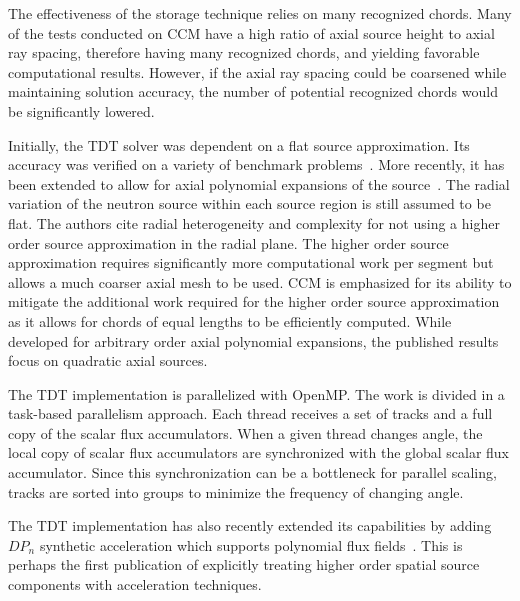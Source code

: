 
The effectiveness of the storage technique relies on many recognized chords. Many of the tests conducted on \ac{CCM} have a high ratio of axial source height to axial ray spacing, therefore having many recognized chords, and yielding favorable computational results. However, if the axial ray spacing could be coarsened while maintaining solution accuracy, the number of potential recognized chords would be significantly lowered.



Initially, the TDT solver was dependent on a flat source approximation. Its accuracy was verified on a variety of benchmark problems~\cite{apollo3_3dmoc, apollo3_vv}. More recently, it has been extended to allow for axial polynomial expansions of the source~\cite{apollo3_extruded}. The radial variation of the neutron source within each source region is still assumed to be flat. The authors cite radial heterogeneity and complexity for not using a higher order source approximation in the radial plane. The higher order source approximation requires significantly more computational work per segment but allows a much coarser axial mesh to be used. \ac{CCM} is emphasized for its ability to mitigate the additional work required for the higher order source approximation as it allows for chords of equal lengths to be efficiently computed. While developed for arbitrary order axial polynomial expansions, the published results focus on quadratic axial sources.

The TDT implementation is parallelized with OpenMP. The work is divided in a task-based parallelism approach. Each thread receives a set of tracks and a full copy of the scalar flux accumulators. When a given thread changes angle, the local copy of scalar flux accumulators are synchronized with the global scalar flux accumulator. Since this synchronization can be a bottleneck for parallel scaling, tracks are sorted into groups to minimize the frequency of changing angle.

The TDT implementation has also recently extended its capabilities by adding $DP_n$ synthetic acceleration which supports polynomial flux fields~\cite{apollo3_exp}. This is perhaps the first publication of explicitly treating higher order spatial source components with acceleration techniques.

